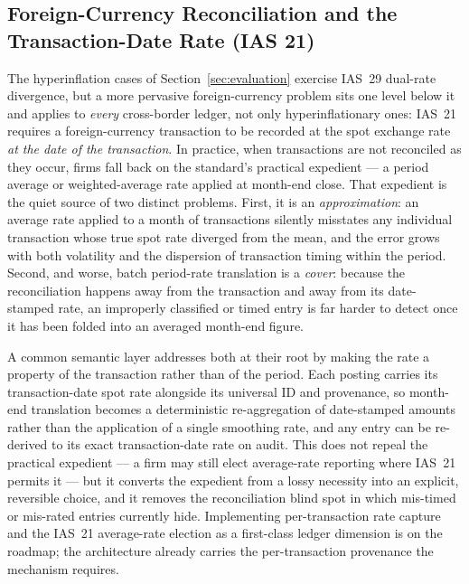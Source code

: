 \subsection{Foreign-Currency Reconciliation and the Transaction-Date Rate (IAS 21)}
\label{subsec:fx_reconciliation}
The hyperinflation cases of Section~\ref{sec:evaluation} exercise IAS~29
dual-rate divergence, but a more pervasive foreign-currency problem sits one
level below it and applies to \emph{every} cross-border ledger, not only
hyperinflationary ones: IAS~21 requires a foreign-currency transaction to be
recorded at the spot exchange rate \emph{at the date of the transaction}. In
practice, when transactions are not reconciled as they occur, firms fall back
on the standard's practical expedient --- a period average or weighted-average
rate applied at month-end close. That expedient is the quiet source of two
distinct problems. First, it is an \emph{approximation}: an average rate
applied to a month of transactions silently misstates any individual
transaction whose true spot rate diverged from the mean, and the error grows
with both volatility and the dispersion of transaction timing within the
period. Second, and worse, batch period-rate translation is a \emph{cover}:
because the reconciliation happens away from the transaction and away from its
date-stamped rate, an improperly classified or timed entry is far harder to
detect once it has been folded into an averaged month-end figure.

A common semantic layer addresses both at their root by making the rate a
property of the transaction rather than of the period. Each posting carries its
transaction-date spot rate alongside its universal ID and provenance, so
month-end translation becomes a deterministic re-aggregation of date-stamped
amounts rather than the application of a single smoothing rate, and any entry
can be re-derived to its exact transaction-date rate on audit. This does not
repeal the practical expedient --- a firm may still elect average-rate
reporting where IAS~21 permits it --- but it converts the expedient from a
lossy necessity into an explicit, reversible choice, and it removes the
reconciliation blind spot in which mis-timed or mis-rated entries currently
hide. Implementing per-transaction rate capture and the IAS~21 average-rate
election as a first-class ledger dimension is on the roadmap; the architecture
already carries the per-transaction provenance the mechanism requires.
